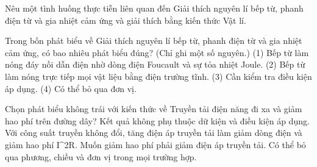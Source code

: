 \begin{bt}
Nêu một tình huống thực tiễn liên quan đến Giải thích nguyên lí bếp từ, phanh điện từ và gia nhiệt cảm ứng và giải thích bằng kiến thức Vật lí.
\end{bt}

\begin{ex}
Trong bốn phát biểu về Giải thích nguyên lí bếp từ, phanh điện từ và gia nhiệt cảm ứng, có bao nhiêu phát biểu đúng? (Chỉ ghi một số nguyên.) (1) Bếp từ làm nóng đáy nồi dẫn điện nhờ dòng điện Foucault và sự tỏa nhiệt Joule. (2) Bếp từ làm nóng trực tiếp mọi vật liệu bằng điện trường tĩnh. (3) Cần kiểm tra điều kiện áp dụng. (4) Có thể bỏ qua đơn vị.
\end{ex}

\begin{ex}
Chọn phát biểu không trái với kiến thức về Truyền tải điện năng đi xa và giảm hao phí trên đường dây?
\choice
{Kết quả không phụ thuộc dữ kiện và điều kiện áp dụng.}
{\True Với công suất truyền không đổi, tăng điện áp truyền tải làm giảm dòng điện và giảm hao phí I^2R.}
{Muốn giảm hao phí phải giảm điện áp truyền tải.}
{Có thể bỏ qua phương, chiều và đơn vị trong mọi trường hợp.}
\end{ex}

